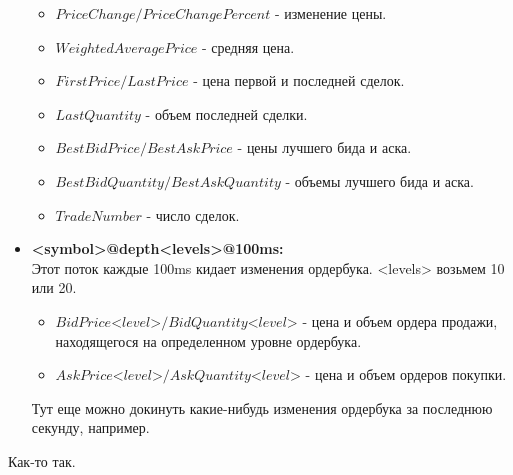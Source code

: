 \documentclass[a4paper,12pt]{article}
\begin{document}
\begin{itemize}
	\begin{itemize}
		\item $PriceChange/PriceChangePercent$ - изменение цены.
		\item $WeightedAveragePrice$ - средняя цена.
		\item $FirstPrice/LastPrice$ - цена первой и последней сделок. 
		\item $LastQuantity$ - объем последней сделки.
		\item $BestBidPrice/BestAskPrice$ - цены лучшего бида и аска.
		\item $BestBidQuantity/BestAskQuantity$ - объемы лучшего бида и аска.
		\item $TradeNumber$ - число сделок.
	\end{itemize}
	\item \textbf{<symbol>@depth<levels>@100ms:}\\
	Этот поток каждые 100ms кидает изменения ордербука. <levels> возьмем 10 или 20.
	\begin{itemize}
		\item $BidPrice\text{<}level\text{>}/BidQuantity\text{<}level\text{>}$ - цена и объем ордера продажи, находящегося на определенном уровне ордербука.
		\item $AskPrice\text{<}level\text{>}/AskQuantity\text{<}level\text{>}$ - цена и объем ордеров покупки.
	\end{itemize}
	Тут еще можно докинуть какие-нибудь изменения ордербука за последнюю секунду, например.
\end{itemize}

Как-то так.
\end{document}

